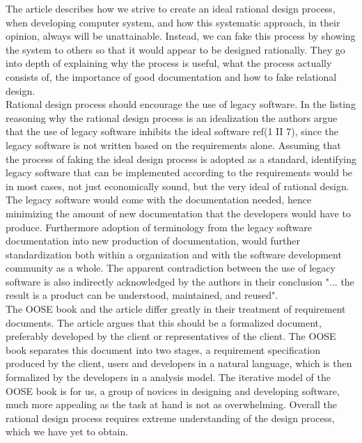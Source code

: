\documentclass[12pt]{article}
\begin{document}
The article describes how we strive to create an ideal rational design process, when developing computer system, and how this systematic approach, in their opinion, always will be unattainable. Instead, we can fake this process by showing the system to others so that it would appear to be designed rationally. They go into depth of explaining why the process is useful, what the process actually consists of, the importance of good documentation and how to fake relational design.\\

Rational design process should encourage the use of legacy software. In the listing reasoning why the rational design process is an idealization the authors argue that the use of legacy software inhibits the ideal software ref(1 II 7), since the legacy software is not written based on the requirements alone. Assuming that the process of faking the ideal design process is adopted as a standard, identifying legacy software that can be implemented according to the requirements would be in most cases, not just economically sound, but the very ideal of rational design. The legacy software would come with the documentation needed, hence minimizing  the amount of new documentation that the developers would have to produce. Furthermore adoption of terminology from the legacy software documentation into new production of documentation, would further standardization both within a organization and with the software development community as a whole. The apparent contradiction between the use of legacy software is also indirectly acknowledged by the authors in their conclusion "... the result is a product can be understood, maintained, and reused".\\

The OOSE book and the article differ greatly in their treatment of requirement documents. The article argues that this should be a formalized document, preferably developed by the client or representatives of the client. The OOSE book separates this document into two stages, a requirement specification produced by the client, users and developers in a natural language, which is then formalized by the developers in a analysis model. The iterative model of the OOSE book is for us, a group of novices in designing and developing software, much more appealing as the task at hand is not as overwhelming. Overall the rational design process requires extreme understanding of the design process, which we have yet to obtain.
\end{document}
